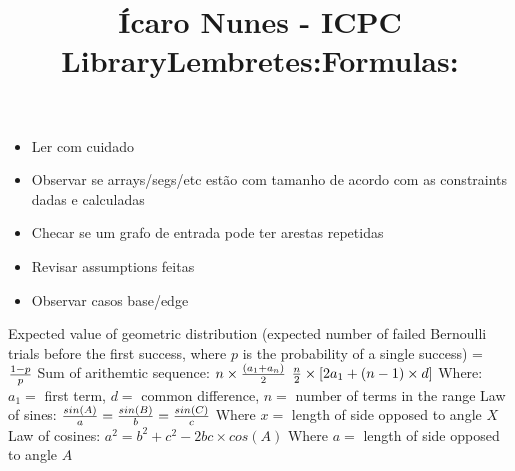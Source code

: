 \documentclass[10pt]{article}
\title{\vspace{-4ex}\Large{Ícaro Nunes - ICPC Library}}
\author{}
\date{}
\begin{document}
\begin{landscape}
\begin{multicols}{2}

\maketitle
\vspace{-13ex}

\title{Lembretes:}
\begin{itemize}
  \item Ler com cuidado
  \item Observar se arrays/segs/etc estão com tamanho de acordo com as constraints dadas e calculadas
  \item Checar se um grafo de entrada pode ter arestas repetidas
  \item Revisar assumptions feitas
  \item Observar casos base/edge
\end{itemize}

\title{Formulas:}
\begin{outline}
  \1 Expected value of geometric distribution (expected number of failed Bernoulli trials before the first success, where $p$ is the probability of a single success) = ${1-p}\over p$
  \1 Sum of arithemtic sequence:
    \2 $n\times{({a_1+a_n})\over{2}}$
    \2 ${n\over2}\times{[2a_1 + (n-1)\times d]}$
    \2 Where: $a_1 =$ first term, $d =$ common difference, $n =$ number of terms in the range
  \1 Law of sines:
    \2 $ {sin(A)\over{a}} = {sin(B)\over{b}} = {sin(C)\over{c}} $
    \2 Where $x =$ length of side opposed to angle $X$
  \1 Law of cosines:
    \2 $ a^2 = b^2 + c^2 - 2bc\times{cos(A)} $
    \2 Where $a =$ length of side opposed to angle $A$
\end{outline}

\tableofcontents
\pagestyle{fancy}



\end{multicols}
\end{landscape}
\end{document}

